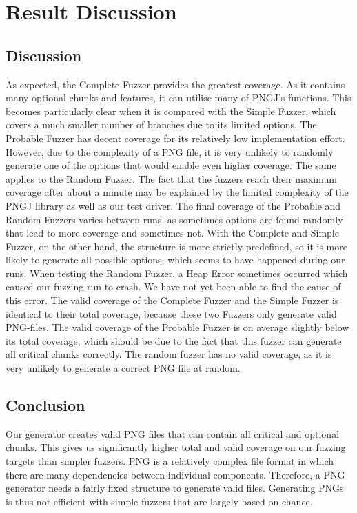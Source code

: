 \documentclass[runningheads]{llncs}
\begin{document}
\section{Result Discussion}

\subsection{Discussion}
As expected, the Complete Fuzzer provides the greatest coverage. As it contains many optional chunks and features, it can utilise many of PNGJ's functions. This becomes particularly clear when it is compared with the Simple Fuzzer, which covers a much smaller number of branches due to its limited options. The Probable Fuzzer has decent coverage for its relatively low implementation effort. However, due to the complexity of a PNG file, it is very unlikely to randomly generate one of the options that would enable even higher coverage. The same applies to the Random Fuzzer.\newline
The fact that the fuzzers reach their maximum coverage after about a minute may be explained by the limited complexity of the PNGJ library as well as our test driver. The final coverage of the Probable and Random Fuzzers varies between runs, as sometimes options are found randomly that lead to more coverage and sometimes not. With the Complete and Simple Fuzzer, on the other hand, the structure is more strictly predefined, so it is more likely to generate all possible options, which seems to have happened during our runs.\newline
When testing the Random Fuzzer, a Heap Error sometimes occurred which caused our fuzzing run to crash. We have not yet been able to find the cause of this error.\newline
The valid coverage of the Complete Fuzzer and the Simple Fuzzer is identical to their total coverage, because these two Fuzzers only generate valid PNG-files. The valid coverage of the Probable Fuzzer is on average slightly below its total coverage, which should be due to the fact that this fuzzer can generate all critical chunks correctly. The random fuzzer has no valid coverage, as it is very unlikely to generate a correct PNG file at random.

\subsection{Conclusion}
Our generator creates valid PNG files that can contain all critical and optional chunks. This gives us significantly higher total and valid coverage on our fuzzing targets than simpler fuzzers. PNG is a relatively complex file format in which there are many dependencies between individual components. Therefore, a PNG generator needs a fairly fixed structure to generate valid files. Generating PNGs is thus not efficient with simple fuzzers that are largely based on chance.
\end{document}
